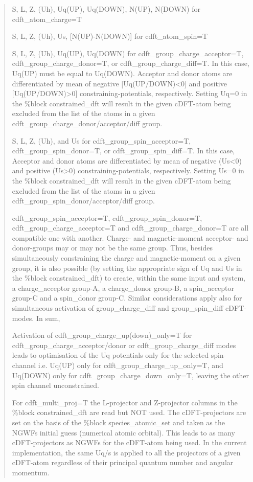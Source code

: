 \documentclass[letterpaper,10pt,english]{sphinxmanual}
\begin{document}
\begin{quote}

S, L, Z, (Uh), Uq(UP), Uq(DOWN), N(UP), N(DOWN) for
cdft\_atom\_charge=T

S, L, Z, (Uh), Us, {[}N(UP)-N(DOWN){]} for cdft\_atom\_spin=T

S, L, Z, (Uh), Uq(UP), Uq(DOWN) for cdft\_group\_charge\_acceptor=T,
cdft\_group\_charge\_donor=T, or cdft\_group\_charge\_diff=T. In
this case, Uq(UP) must be equal to Uq(DOWN). Acceptor and donor
atoms are differentiated by mean of negative {[}Uq(UP/DOWN)\textless{}0{]} and
positive {[}Uq(UP/DOWN)\textgreater{}0{]} constraining-potentials, respectively.
Setting Uq=0 in the \%block constrained\_dft will result in the given
cDFT-atom being excluded from the list of the atoms in a given
cdft\_group\_charge\_donor/acceptor/diff group.

S, L, Z, (Uh), and Us for cdft\_group\_spin\_acceptor=T,
cdft\_group\_spin\_donor=T, or cdft\_group\_spin\_diff=T. In this
case, Acceptor and donor atoms are differentiated by mean of
negative (Us\textless{}0) and positive (Us\textgreater{}0) constraining-potentials,
respectively. Setting Us=0 in the \%block constrained\_dft will
result in the given cDFT-atom being excluded from the list of the
atoms in a given cdft\_group\_spin\_donor/acceptor/diff group.

cdft\_group\_spin\_acceptor=T, cdft\_group\_spin\_donor=T,
cdft\_group\_charge\_acceptor=T and cdft\_group\_charge\_donor=T are
all compatible one with another. Charge- and magnetic-moment
acceptor- and donor-groups may or may not be the same group. Thus,
besides simultaneously constraining the charge and magnetic-moment
on a given group, it is also possible (by setting the appropriate
sign of Uq and Us in the \%block constrained\_dft) to create, within
the same input and system, a charge\_acceptor group-A, a
charge\_donor group-B, a spin\_acceptor group-C and a spin\_donor
group-C. Similar considerations apply also for simultaneous
activation of group\_charge\_diff and group\_spin\_diff cDFT-modes.
In sum,

Activation of cdft\_group\_charge\_up(down)\_only=T for
cdft\_group\_charge\_acceptor/donor or cdft\_group\_charge\_diff
modes leads to optimisation of the Uq potentials only for the
selected spin-channel i.e. Uq(UP) only for
cdft\_group\_charge\_up\_only=T, and Uq(DOWN) only for
cdft\_group\_charge\_down\_only=T, leaving the other spin channel
unconstrained.

For cdft\_multi\_proj=T the L-projector and Z-projector columns in
the \%block constrained\_dft are read but NOT used. The
cDFT-projectors are set on the basis of the \%block
species\_atomic\_set and taken as the NGWFs initial guess (numerical
atomic orbital). This leads to as many cDFT-projectors as NGWFs for
the cDFT-atom being used. In the current implementation, the same
Uq/s is applied to all the projectors of a given cDFT-atom
regardless of their principal quantum number and angular momentum.


\end{quote}
\end{document}
